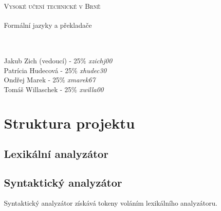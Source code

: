\documentclass[11pt, a4paper]{article}
\begin{document}
	\begin{titlepage}
		\begin{center}
			 \textsc{{\Huge Vysoké učení technické v Brně}\\ 
			 \vspace{8.5pt}{\huge Fakulta informačních technologií}}\\
			{\LARGE Formální jazyky a překladače\\}
				\vspace{5pt}{\Huge Dokumentace ke skupinovému projektu}\\
				\vspace{2pt}{\Large Tým 47, varianta I}
			\\
		\end{center}
		{\small Jakub Zich (vedoucí) - 25\% \emph{xzichj00} \hfill \\
		Patrícia Hudecová - 25\% \emph{xhudec30} \hfill \\
		Ondřej Marek - 25\% \emph{xmarek67} \hfill\\
		Tomáš Willaschek - 25\% \emph{xwilla00} \hfill }
	
	\end{titlepage}	
	\section{Struktura projektu}
	
	\subsection{Lexikální analyzátor}
	\subsection{Syntaktický analyzátor}
	Syntaktický analyzátor získává tokeny voláním lexikálního analyzátoru.
\end{document}
